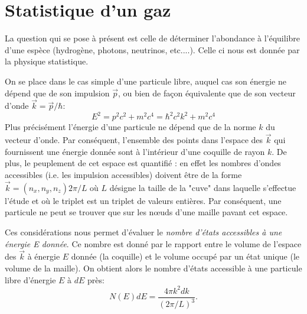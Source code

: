 \section{Statistique d'un gaz}
La question qui se pose à présent est celle de déterminer l'abondance à l'équilibre d'une espèce (hydrogène, photons, neutrinos, etc....). Celle ci nous est donnée par la physique statistique.

On se place dans le cas simple d'une particule libre, auquel cas son énergie ne dépend que de son impulsion $\vec p$, ou bien de façon équivalente que de son vecteur d'onde $\vec k =\vec p /\hbar$:
\begin{equation}
E^2=p^2c^2+m^2c^4=\hbar^2 c^2 k^2 +m^2c^4
\end{equation}
 Plus précisément l'énergie d'une particule ne dépend que de la norme $k$ du vecteur d'onde. Par conséquent, l'ensemble des points dans l'espace des $\vec k$ qui fournissent une énergie donnée sont à l'intérieur d'une coquille de rayon $k$. De plus, le peuplement de cet espace est quantifié : en effet les nombres d'ondes accessibles (i.e. les impulsion accessibles) doivent être de la forme $\vec k = (n_x,n_y,n_z) 2\pi/L $ où $L$ désigne la taille de la "cuve" dans laquelle s'effectue l'étude et où le triplet est un triplet de valeurs entières. Par conséquent, une particule ne peut se trouver que sur les nœuds d'une maille pavant cet espace. 

Ces considérations nous permet d'évaluer le \textit{nombre d'états accessibles à une énergie E donnée}. Ce nombre est donné par le rapport entre le volume de l'espace des $\vec k$ à énergie $E$ donnée (la coquille) et le volume occupé par un état unique (le volume de la maille). On obtient alors le nombre d'états accessible à une particule libre d'énergie $E$ à $dE$ près:
\begin{equation}
N(E)dE=\frac{4\pi k^2 dk}{(2\pi/L)^3}.
\label{e:densetat}
\end{equation}

